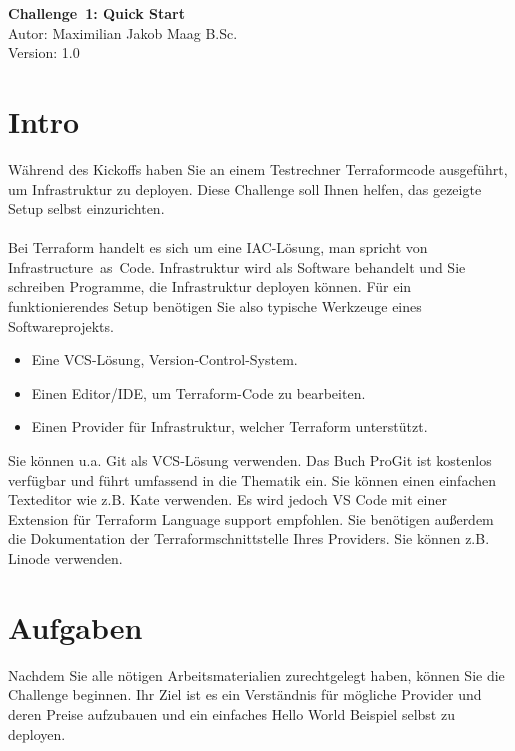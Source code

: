\documentclass{article}
\begin{document}
    \begin{center}
        \Large \textbf{Challenge 1: Quick Start} \\ [6pt]
        \normalsize
        Autor: Maximilian Jakob Maag B.Sc. \\
        Version: 1.0
    \end{center}
    \section{Intro}
    Während des Kickoffs haben Sie an einem Testrechner Terraformcode ausgeführt, 
    um Infrastruktur zu deployen.
    Diese Challenge soll Ihnen helfen, das gezeigte Setup selbst einzurichten. \\ \\
    Bei Terraform handelt es sich um eine IAC-Lösung, man spricht von Infrastructure as Code. Infrastruktur wird als Software behandelt und Sie schreiben Programme, die Infrastruktur deployen können.
    Für ein funktionierendes Setup benötigen Sie also typische Werkzeuge eines Softwareprojekts.
    \begin{itemize}
        \item Eine VCS-Lösung, Version‑Control-System.
        \item Einen Editor/IDE, um Terraform-Code zu bearbeiten.
        \item Einen Provider für Infrastruktur, welcher Terraform unterstützt. 
    \end{itemize}
    Sie können u.a. Git als VCS‑Lösung verwenden. Das Buch ProGit ist kostenlos verfügbar und führt umfassend in die Thematik ein.
    Sie können einen einfachen Texteditor wie z.B. Kate verwenden. Es wird jedoch VS Code mit einer Extension für Terraform Language support empfohlen.
    Sie benötigen außerdem die Dokumentation der Terraformschnittstelle Ihres Providers. Sie können z.B. Linode verwenden.

    \section{Aufgaben}
    Nachdem Sie alle nötigen Arbeitsmaterialien zurechtgelegt haben, können Sie die Challenge beginnen.
    Ihr Ziel ist es ein Verständnis für mögliche Provider und deren Preise aufzubauen und ein einfaches Hello World Beispiel selbst zu deployen.
\end{document}

